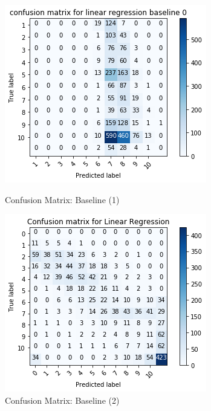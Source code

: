\documentclass[a4paper, 11pt]{article}
\begin{document}
\begin{figure}[!htb] 
  \includegraphics[width=\linewidth]{confmat_lr.png}
     \caption{Confusion Matrix: Baseline (1)}
    \label{fig:confmat_lr}
\endminipage\hfill
{}
    \includegraphics[width=\linewidth]{confmat_linear_new.png}
    \caption{Confusion Matrix: Baseline (2)}
    \label{fig:confmat_lr_2}
\endminipage\hfill
\end{figure}
\end{document}
